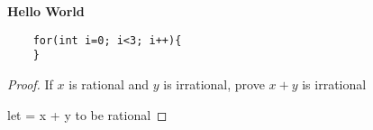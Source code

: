 \documentclass{article}
\begin{document}
\textbf{Hello World}
\begin{verbatim}
    for(int i=0; i<3; i++){
    }
\end{verbatim}

\begin{proof}
If $x$ is rational and $y$ is irrational, prove $x + y$ is irrational 

let     = x + y to be rational 
        \frac{}{} 
        \frac{}{} 
        \frac{}{} 
        
        \frac{}{} 


\end{proof}
 
 
\end{document}
